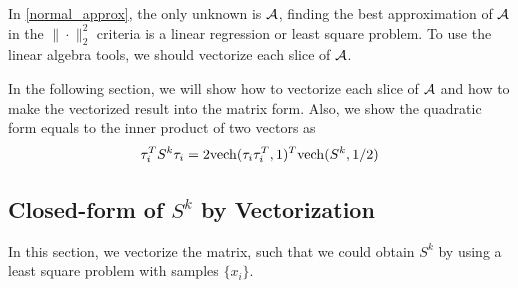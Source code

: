 \documentclass[aos,preprint]{imsart}
\theoremstyle{remark}
\begin{document}
In \eqref{normal_approx}, the only unknown is $\cal A$, finding the best approximation of $\cal A$ in the $\|\cdot\|_2^2$ criteria is a linear regression or least square problem. To use the linear algebra tools, we should vectorize each slice of $\cal A$.

In the following section, we will show how to vectorize each slice of $\cal A$ and  how to make the vectorized result into the matrix form. Also, we show the quadratic form equals to the inner product of two vectors as
\[
\tau_i^T S^{k}\tau_i  = 2{\rm vech}(\tau_i\tau_i^T,1)^T {\rm vech}(S^k,1/2)
\]

\subsection{Closed-form of $S^k$ by Vectorization}
In this section, we vectorize the matrix, such that we could obtain $S^k$ by using a least square problem with samples $\{x_i\}$.
\end{document}
